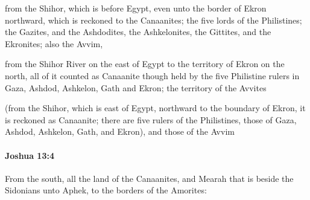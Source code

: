 			\begin{versebox}
					\item[BHS] 
					\item[ASV] from the Shihor, which is before Egypt, even unto the border of Ekron northward, which is reckoned to the Canaanites; the five lords of the Philistines; the Gazites, and the Ashdodites, the Ashkelonites, the Gittites, and the Ekronites; also the Avvim,
					\item[NIV] from the Shihor River on the east of Egypt to the territory of Ekron on the north, all of it counted as Canaanite though held by the five Philistine rulers in Gaza, Ashdod, Ashkelon, Gath and Ekron; the territory of the Avvites
					\item[NRSV] (from the Shihor, which is east of Egypt, northward to the boundary of Ekron, it is reckoned as Canaanite; there are five rulers of the Philistines, those of Gaza, Ashdod, Ashkelon, Gath, and Ekron), and those of the Avvim
			\end{versebox}

		\paragraph{Joshua 13:4} %
			\label{JOSHUA-13-4}

			From the south, all the land of the Canaanites, and Mearah that is beside the Sidonians unto Aphek, to the borders of the Amorites:

